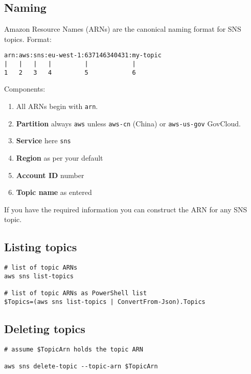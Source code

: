 \subsection{Naming}\label{naming}

Amazon Resource Names (ARNs) are the canonical naming format for SNS
topics. Format:

\begin{verbatim}
arn:aws:sns:eu-west-1:637146340431:my-topic
|   |   |   |         |            |
1   2   3   4         5            6
\end{verbatim}

Components:

\begin{enumerate}
\item
  All ARNs begin with \texttt{arn}.
\item
  \textbf{Partition} always \texttt{aws} unless \texttt{aws-cn} (China)
  or \texttt{aws-us-gov} GovCloud.
\item
  \textbf{Service} here \texttt{sns}
\item
  \textbf{Region} as per your default
\item
  \textbf{Account ID} number
\item
  \textbf{Topic name} as entered
\end{enumerate}

If you have the required information you can construct the ARN for any
SNS topic.

\subsection{Listing topics}\label{listing-topics}

\begin{verbatim}
# list of topic ARNs
aws sns list-topics

# list of topic ARNs as PowerShell list
$Topics=(aws sns list-topics | ConvertFrom-Json).Topics
\end{verbatim}

\subsection{Deleting topics}\label{deleting-topics}

\begin{verbatim}
# assume $TopicArn holds the topic ARN

aws sns delete-topic --topic-arn $TopicArn
\end{verbatim}

